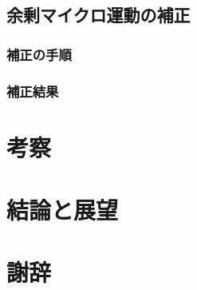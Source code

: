 \documentclass[a4j,10.5pt,titlepage]{jarticle}
\begin{document}
	\subsection{余剰マイクロ運動の補正}
		\subsubsection{補正の手順}
		\subsubsection{補正結果}
\clearpage
\section{考察}
\clearpage
\section{結論と展望}
\clearpage
\section*{謝辞}
\clearpage
\begin{thebibliography}{99}
\end{thebibliography}


%
%
%
%
%
%
%
\end{document}

